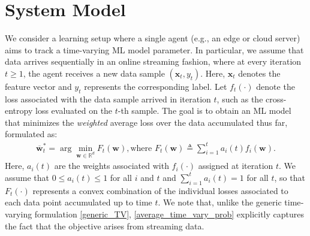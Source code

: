 \documentclass[conference]{IEEEtran}
\begin{document}
\section{System Model}
\label{sec:system_model}
We consider a learning setup where a single agent (e.g., an edge or cloud server) aims to track a time-varying ML model parameter. In particular, we assume that data arrives sequentially in an online streaming fashion, where at every iteration $t{\geq}1$, the agent receives a new data sample 
$(\mathbf{x}_t, y_t)$. Here, $ \mathbf{x}_t$  denotes the feature vector and $ y_t$ represents the corresponding label. Let $f_t(\cdot)$ denote the loss associated with the data sample arrived in iteration $t$, such as the cross-entropy loss evaluated on the $t$-th sample. The goal is to obtain an ML model that minimizes the \emph{weighted} average loss over the data accumulated thus far, formulated as:
\begin{align}
   \overline{\mathbf{w}}^*_t = \arg \min_{\mathbf{w} \in \mathbb{R}^d} F_t(\mathbf{w}), \text{where } F_t(\mathbf{w})\triangleq \sum_{i=1}^t a_i(t) f_i(\mathbf{w}).
    \label{average_time_vary_prob}
\end{align}
Here, $a_i(t)$ are the weights associated with $f_i(\cdot)$ assigned at iteration $t$. We assume that $ 0 \leq a_i(t)\leq 1 $ for all $i$ and $t$ and $\sum_{i=1}^t a_i(t) =1$ for all $t$, so that $F_t(\cdot)$ represents a convex combination of the individual losses associated to each data point accumulated up to time $t$. We note that, unlike the generic time‐varying formulation \eqref{generic_TV}, \eqref{average_time_vary_prob} explicitly captures the fact that the objective arises from streaming data.
\end{document}
